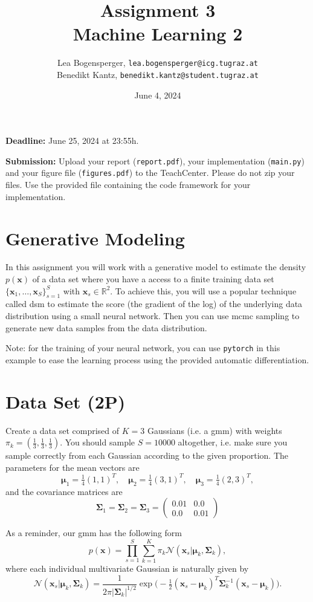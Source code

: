 \documentclass{article}
\title{{\Huge \textbf{Assignment 3}} \\ {\Large \textbf{Machine Learning 2}}}
\author{Lea Bogensperger, \texttt{lea.bogensperger@icg.tugraz.at}\vspace{-0.4cm} \\ Benedikt Kantz, \texttt{benedikt.kantz@student.tugraz.at}}
\date{June 4, 2024}
\newcommand{\deadline}{\noindent\textbf{Deadline:}\xspace}
\newcommand{\submission}{\noindent\textbf{Submission:}\xspace}
\newcommand{\sig}{\boldsymbol{\Sigma}}
\newcommand{\m}{\boldsymbol{\mu}}
\renewcommand{\vec}[1]{\textbf{#1}}
\renewcommand{\vec}[1]{\textbf{#1}}
\begin{document}
\maketitle

\vspace{0.5cm}
\deadline
June 25, 2024 at 23:55h.

\submission 
Upload your report (\texttt{report.pdf}), your implementation (\texttt{main.py}) and your figure file (\texttt{figures.pdf}) to the TeachCenter. Please do not zip your files. Use the provided file containing the code framework for your implementation.

\section*{Generative Modeling}
In this assignment you will work with a generative model to estimate the density $p(\vec x)$ of a data set where you have a access to a finite training data set $\{\vec x_1,\dots, \vec x_S\}_{s=1}^S$ with $\vec x_s \in \mathbb{R}^2$. To achieve this, you will use a popular technique called \gls{dsm} to estimate the score (the gradient of the log) of the underlying data distribution using a small neural network. Then you can use \gls{mcmc} sampling to generate new data samples from the data distribution. 

Note: for the training of your neural network, you can use \texttt{pytorch} in this example to ease the learning process using the provided automatic differentiation. 
\section{Data Set (2P)}
Create a data set comprised of $K=3$ Gaussians (i.e. a \gls{gmm}) with weights $\pi_k = (\tfrac 13,\tfrac 13,\tfrac 13)$. You should sample $S=10000$ altogether, i.e. make sure you sample correctly from each Gaussian according to the given proportion. The parameters for the mean vectors are
\[
\m_1 = \tfrac 14 (1,1)^T, \quad \m_2 = \tfrac 14  (3,1)^T, \quad \m_3 = \tfrac 14 (2,3)^T,
\]
and the covariance matrices are
\[
\sig_1 = \sig_2 = \sig_3 = \begin{pmatrix}
0.01 & 0.0 \\ 0.0 & 0.01\end{pmatrix}
\]

As a reminder,  our \gls{gmm} has the following form
\begin{equation}
p(\vec x) = \prod_{s=1}^S \sum_{k=1}^K \pi_k \mathcal{N}(\vec x_s|\boldsymbol{\mu}_k, \boldsymbol{\Sigma}_k), 
\end{equation}
where each individual multivariate Gaussian is naturally given by
\[
\mathcal{N}(\vec x_s|\boldsymbol{\mu}_k, \boldsymbol{\Sigma}_k) = \frac{1}{2\pi |\boldsymbol{\Sigma}_k|^{1/2} } \exp\big (-\tfrac 1 2 (\vec x_s - \boldsymbol{\mu}_k)^T \boldsymbol{\Sigma}_k^{-1} (\vec x_s - \boldsymbol{\mu}_k)\big).
\]
\end{document}
